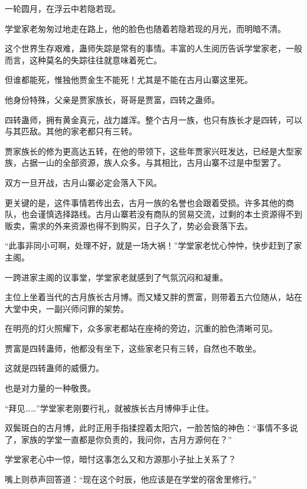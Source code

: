 
\begin{this_body}

一轮圆月，在浮云中若隐若现。

学堂家老匆匆过地走在路上，他的脸色也随着若隐若现的月光，而明暗不清。

这个世界生存艰难，蛊师失踪是常有的事情。丰富的人生阅历告诉学堂家老，一般而言，这种莫名的失踪往往就意味着死亡。

但谁都能死，惟独他贾金生不能死！尤其是不能在古月山寨这里死。

他身份特殊，父亲是贾家族长，哥哥是贾富，四转之蛊师。

四转蛊师，拥有黄金真元，战力雄浑。整个古月一族，也只有族长才是四转，可以与其匹敌。其他的家老都只有三转。

贾家族长的修为更高达五转，在他的带领下，这些年贾家兴旺发达，已经是大型家族，占据一山的全部资源，族人众多。与其相比，古月山寨不过是中型罢了。

双方一旦开战，古月山寨必定会落入下风。

更关键的是，这件事情若传出去，古月一族的名誉也会跟着受损。许多其他的商队，也会谨慎选择路线。古月山寨若没有商队的贸易交流，过剩的本土资源得不到贩卖，需求的外来资源也得不到购买，日子久了，势必会衰落下去。

“此事非同小可啊，处理不好，就是一场大祸！”学堂家老忧心忡忡，快步赶到了家主阁。

一跨进家主阁的议事堂，学堂家老就感到了气氛沉闷和凝重。

主位上坐着当代的古月族长古月博。而又矮又胖的贾富，则带着五六位随从，站在大堂中央，一副兴师问罪的架势。

在明亮的灯火照耀下，众多家老都站在座椅的旁边，沉重的脸色清晰可见。

贾富是四转蛊师，他都没有坐下，这些家老只有三转，自然也不敢坐。

这就是四转蛊师的威慑力。

也是对力量的一种敬畏。

“拜见……”学堂家老刚要行礼，就被族长古月博伸手止住。

双鬓斑白的古月博，此时正用手指揉捏着太阳穴，一脸苦恼的神色：“事情不多说了，家族的学堂一直都是你负责的，我问你，古月方源何在？”

学堂家老心中一惊，暗忖这事怎么又和方源那小子扯上关系了？

嘴上则恭声回答道：“现在这个时辰，他应该是在学堂的宿舍里修行。”


\end{this_body}
